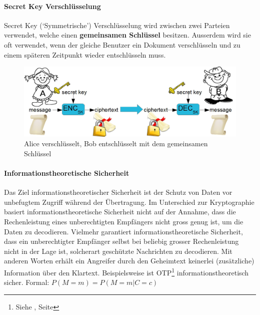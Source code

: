 \documentclass[10pt,a4paper]{article}
\begin{document}
\paragraph*{Secret Key Verschlüsselung}Secret Key (`Symmetrische') Verschlüsselung wird zwischen zwei Parteien verwendet, welche einen \textbf{gemeinsamen Schlüssel} besitzen. Ausserdem wird sie oft verwendet, wenn der gleiche Benutzer ein Dokument verschlüsseln und zu einem späteren Zeitpunkt wieder entschlüsseln muss.
\begin{figure}[H]
    \begin{center}
    \includegraphics[width=14cm]{images/secretkey.png}
    \caption{Alice verschlüsselt, Bob entschlüsselt mit dem gemeinsamen Schlüssel}
    \label{secretkey}
    \end{center}
\end{figure}

\paragraph*{Informationstheoretische Sicherheit}Das Ziel informationstheoretischer Sicherheit ist der Schutz von Daten vor unbefugtem Zugriff während der Übertragung. Im Unterschied zur Kryptographie basiert informationstheoretische Sicherheit nicht auf der Annahme, dass die Rechenleistung eines unberechtigten Empfängers nicht gross genug ist, um die Daten zu decodieren. Vielmehr garantiert informationstheoretische Sicherheit, dass ein unberechtigter Empfänger selbst bei beliebig grosser Rechenleistung nicht in der Lage ist, solcherart geschützte Nachrichten zu decodieren. Mit anderen Worten erhält ein Angreifer durch den Geheimtext keinerlei (zusätzliche) Information über den Klartext\cite{renner2006}.
 Beispielsweise ist OTP\footnote{Siehe \underline{}, Seite \pageref{para:One-Time Pad}} informationstheoretisch sicher. \newline %
Formal:
\begin{math}
    P(M=m) = P(M=m|C=c)
\end{math}
\end{document}
